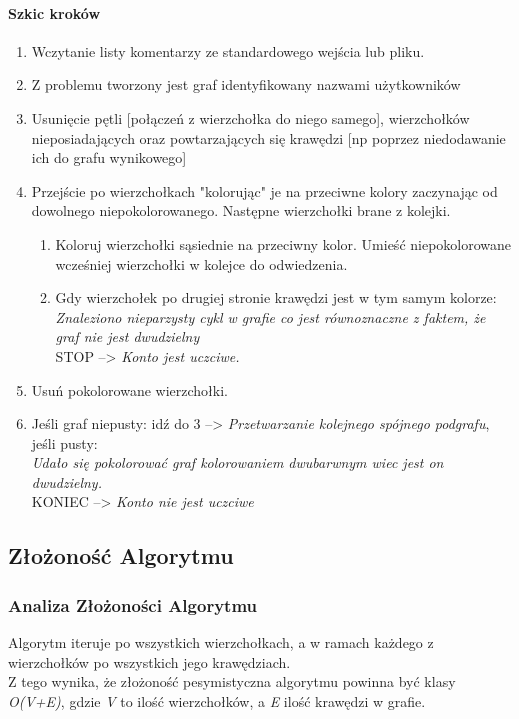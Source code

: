 \documentclass[11pt]{article}
\newcommand{\+}{\discretionary{\mbox{\scriptsize$\hookleftarrow$}}{}{}}
\begin{document}
\paragraph{Szkic kroków}
\renewcommand{\labelenumi}{\arabic{enumi}}
\begin{enumerate}
\item
Wczytanie listy komentarzy ze standardowego wejścia lub pliku.
\item
Z problemu tworzony jest graf identyfikowany nazwami użytkowników
\item
Usunięcie pętli [połączeń z wierzchołka do niego samego], wierzchołków nieposiadających oraz powtarzających się krawędzi [np poprzez niedodawanie ich do grafu wynikowego]
\item
Przejście po wierzchołkach "kolorując" je na przeciwne kolory zaczynając od dowolnego niepokolorowanego. Następne wierzchołki brane z kolejki.
\renewcommand{\labelenumii}{\Roman{enumii}}
\begin{enumerate}
\item
Koloruj wierzchołki sąsiednie na przeciwny kolor. Umieść niepokolorowane wcześniej wierzchołki w kolejce do odwiedzenia.
\item
Gdy wierzchołek po drugiej stronie krawędzi jest w tym samym kolorze: \\
\textit{Znaleziono nieparzysty cykl w grafie co jest równoznaczne z faktem, że graf nie jest dwudzielny}\\
STOP --> \textsl{Konto jest uczciwe.}
\end{enumerate}
\item
Usuń pokolorowane wierzchołki.
\item
Jeśli graf niepusty: idź do 3 --> \textsl{Przetwarzanie kolejnego spójnego podgrafu},\\ jeśli pusty: \\
\textit{Udało się pokolorować graf kolorowaniem dwubarwnym wiec jest on dwudzielny.}\\
KONIEC --> \textsl{Konto nie jest uczciwe}
\end{enumerate}
\subsection{Złożoność Algorytmu}
\subsubsection{Analiza Złożoności Algorytmu}
Algorytm iteruje po wszystkich wierzchołkach, a w ramach każdego z wierzchołków po wszystkich jego krawędziach.\\
Z tego wynika, że złożoność pesymistyczna algorytmu powinna być klasy \textit{O(V+E)}, gdzie \textit{V} to ilość wierzchołków, a \textit{E} ilość krawędzi w grafie.
\end{document}
